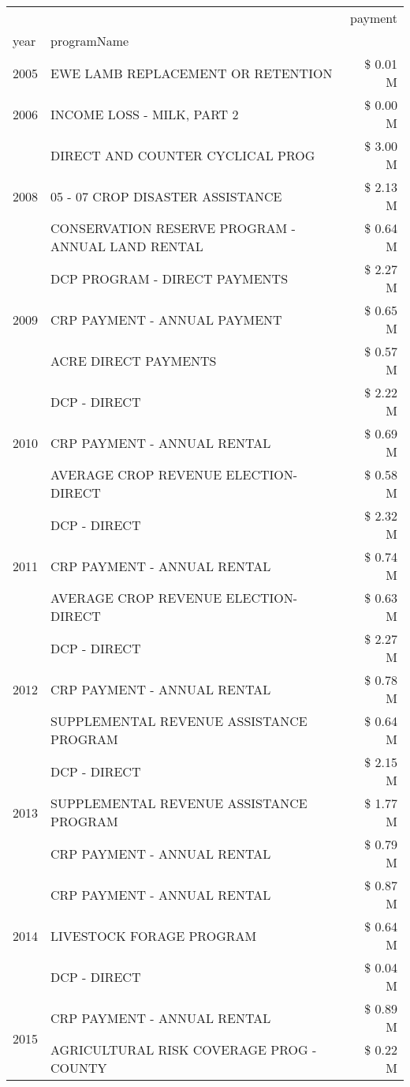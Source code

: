 \begin{tabular}{llr}
\toprule
 &  & payment \\
year & programName &  \\
\midrule
2005 & EWE LAMB REPLACEMENT OR RETENTION & \$ 0.01 M \\
\cline{1-3}
2006 & INCOME LOSS - MILK, PART 2 & \$ 0.00 M \\
\cline{1-3}
\multirow[t]{3}{*}{2008} & DIRECT AND COUNTER CYCLICAL PROG & \$ 3.00 M \\
 & 05 - 07 CROP DISASTER ASSISTANCE & \$ 2.13 M \\
 & CONSERVATION RESERVE PROGRAM - ANNUAL LAND RENTAL & \$ 0.64 M \\
\cline{1-3}
\multirow[t]{3}{*}{2009} & DCP PROGRAM - DIRECT PAYMENTS & \$ 2.27 M \\
 & CRP PAYMENT - ANNUAL PAYMENT & \$ 0.65 M \\
 & ACRE DIRECT PAYMENTS & \$ 0.57 M \\
\cline{1-3}
\multirow[t]{3}{*}{2010} & DCP - DIRECT & \$ 2.22 M \\
 & CRP PAYMENT - ANNUAL RENTAL & \$ 0.69 M \\
 & AVERAGE CROP REVENUE ELECTION-DIRECT & \$ 0.58 M \\
\cline{1-3}
\multirow[t]{3}{*}{2011} & DCP - DIRECT & \$ 2.32 M \\
 & CRP PAYMENT - ANNUAL RENTAL & \$ 0.74 M \\
 & AVERAGE CROP REVENUE ELECTION-DIRECT & \$ 0.63 M \\
\cline{1-3}
\multirow[t]{3}{*}{2012} & DCP - DIRECT & \$ 2.27 M \\
 & CRP PAYMENT - ANNUAL RENTAL & \$ 0.78 M \\
 & SUPPLEMENTAL REVENUE ASSISTANCE PROGRAM & \$ 0.64 M \\
\cline{1-3}
\multirow[t]{3}{*}{2013} & DCP - DIRECT & \$ 2.15 M \\
 & SUPPLEMENTAL REVENUE ASSISTANCE PROGRAM & \$ 1.77 M \\
 & CRP PAYMENT - ANNUAL RENTAL & \$ 0.79 M \\
\cline{1-3}
\multirow[t]{3}{*}{2014} & CRP PAYMENT - ANNUAL RENTAL & \$ 0.87 M \\
 & LIVESTOCK FORAGE PROGRAM & \$ 0.64 M \\
 & DCP - DIRECT & \$ 0.04 M \\
\cline{1-3}
\multirow[t]{3}{*}{2015} & CRP PAYMENT - ANNUAL RENTAL & \$ 0.89 M \\
 & AGRICULTURAL RISK COVERAGE PROG - COUNTY & \$ 0.22 M \\

\end{tabular}
